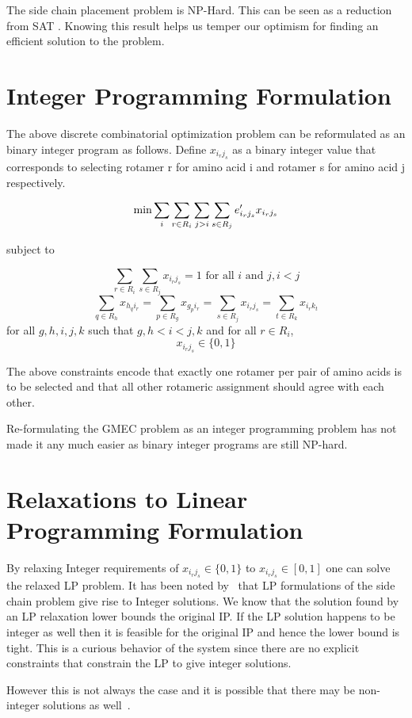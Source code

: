 \documentclass{article} %
\begin{document}
The side chain placement problem is NP-Hard. This can be seen as a reduction from SAT \cite{nphard}. Knowing this result helps us temper our optimism for finding an efficient solution to the problem. 

\section{Integer Programming Formulation}
The above discrete combinatorial optimization problem can be reformulated as an binary integer program as follows. Define $x_{i_rj_s}$ as a binary integer value that corresponds to selecting rotamer r for amino acid i and rotamer s for amino acid j respectively. 

\[
\min \sum_i \sum_{r\in R_i} \sum_{j>i} \sum_{s \in R_j} e'_{i_rj_s}x_{i_rj_s} \\
\]

subject to 

\[
\sum_{r \in R_i}\sum_{s \in R_j} x_{i_rj_s} = 1  \text{ for all $i$ and $j$}, i<j 
\]
\[
\sum_{q  \in R_h}x_{h_qi_r} = \sum_{p \in R_g}x_{g_pi_r} = \sum_{s \in R_j}x_{i_rj_s} = \sum_{t \in R_k}x_{i_rk_t} 
\]
for all $g,h,i,j,k$ such that $g,h<i<j,k$ and for all $r \in R_i$,
\[
x_{i_rj_s} \in \{0,1\}
\]

The above constraints encode that exactly one rotamer per pair of amino acids is to be selected and that all other rotameric assignment should agree with each other. 

Re-formulating the GMEC problem as an integer programming problem has not made it any much easier as binary integer programs are still NP-hard. 

\section{Relaxations to Linear Programming Formulation}
By relaxing Integer requirements of $x_{i_rj_s} \in \{0,1\}$ to $x_{i_rj_s} \in [0,1]$ one can solve the relaxed LP problem. It has been noted by~\cite{eriksson} that LP formulations of the side chain problem give rise to Integer solutions. We know that the solution found by an LP relaxation lower bounds the original IP. If the LP solution happens to be integer as well then it is feasible for the original IP and hence the lower bound is tight. This is a curious behavior of the system since there are no explicit constraints that constrain the LP to give integer solutions. 

However this is not always the case and it is possible that there may be non-integer solutions as well~\cite{scp}. 
\end{document}
